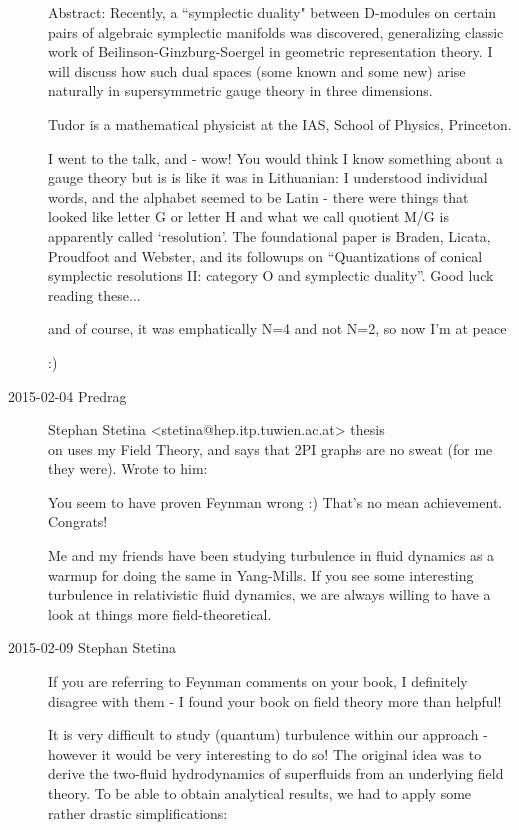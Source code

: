 \begin{description}
Abstract: Recently, a ``symplectic duality" between D-modules on certain
pairs of algebraic symplectic manifolds was discovered, generalizing
classic work of Beilinson-Ginzburg-Soergel in geometric representation
theory. I will discuss how such dual spaces (some known and some new) arise
naturally in supersymmetric gauge theory in three dimensions.

Tudor is a mathematical physicist at the IAS,
School of Physics, Princeton.

I went to the talk, and - wow! You would think I know something about a
gauge theory but is is like it was in Lithuanian: I understood individual
words, and the alphabet seemed to be Latin - there were things that
looked like letter G or letter H and what we call quotient M/G is
apparently called `resolution'. The foundational paper is Braden, Licata,
Proudfoot and Webster, and its followups on
``Quantizations of conical symplectic resolutions II: category O and
symplectic duality''. Good luck reading these...

and of course, it was emphatically N=4 and not N=2, so now I'm at peace

:)

\item[2015-02-04 Predrag] Stephan Stetina
    <stetina@hep.itp.tuwien.ac.at> thesis \\
    on  uses my
     {Field Theory}, and says
    that 2PI graphs are no sweat (for me they were). Wrote to him:

You seem to have
{proven Feynman wrong} :) That's no mean achievement. Congrats!

Me and my friends have been studying turbulence in fluid dynamics as a
warmup for doing the same in Yang-Mills. If you see some interesting
turbulence in relativistic fluid dynamics, we are always willing to have
a look at things more field-theoretical.

\item[2015-02-09 Stephan Stetina]
If you are referring to Feynman comments on your book, I definitely disagree
with them - I found your book on field theory more than helpful!

It is very difficult to study (quantum) turbulence within our approach -
however it would be very interesting to do so! The original idea was to
derive the two-fluid hydrodynamics of superfluids from an underlying
field theory. To be able to obtain analytical results, we had to apply
some rather drastic simplifications:


\end{description}

